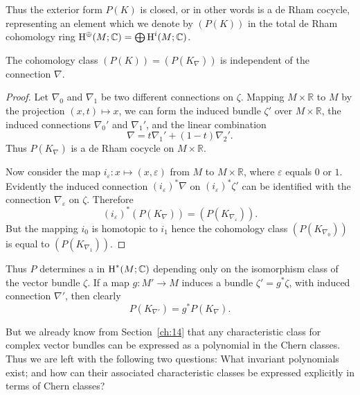 \documentclass[../main]{subfiles}
\begin{document}
Thus the exterior form $P(K)$ is closed, or in other words is a de Rham cocycle, representing an element which we denote by $(P(K))$ in the total de Rham cohomology ring $\operatorname{H}^\oplus(M; \mathbb C) = \bigoplus \operatorname{H}^i(M; \mathbb C)$.

\begin{corollary}
The cohomology class $(P(K)) = (P(K_\nabla))$ is independent of the connection $\nabla$.
\end{corollary}

\begin{proof}
Let $\nabla_0$ and $\nabla_1$ be two different connections on $\zeta$. Mapping $M \times \mathbb R$ to $M$ by the projection $(x, t) \mapsto x$, we can form the induced bundle $\zeta'$ over $M \times \mathbb R$, the induced connections $\nabla_0'$ and $\nabla_1'$, and the linear combination \[\nabla = t \nabla_1' + (1 - t) \nabla_2'.\] Thus $P(K_\nabla)$ is a de Rham cocycle on $M \times \mathbb R$. 

Now consider the map $i_\varepsilon : x \mapsto (x, \varepsilon)$ from $M$ to $M \times \mathbb R$, where $\varepsilon$ equals $0$ or $1$. Evidently the induced connection $(i_\varepsilon)^\ast \nabla$ on $(i_\varepsilon)^\ast \zeta'$ can be identified with the connection $\nabla_\varepsilon$ on $\zeta$. Therefore \[(i_\varepsilon)^\ast (P(K_\nabla)) = (P(K_{\nabla_\varepsilon})).\] But the mapping $i_0$ is homotopic to $i_1$ hence the cohomology class $(P(K_{\nabla_0}))$ is equal to $(P(K_{\nabla_1}))$.
\end{proof}

Thus $P$ determines a  in $\operatorname{H}^\ast(M; \mathbb C)$ depending only on the isomorphism class of the vector bundle $\zeta$. If a map $g : M' \longrightarrow M$ induces a bundle $\zeta' = g^\ast \zeta$, with induced connection $\nabla'$, then clearly \[P(K_{\nabla'}) = g^\ast P(K_\nabla).\]  

But we already know from Section~\ref{ch:14} that any characteristic class for complex vector bundles can be expressed as a polynomial in the Chern classes. Thus we are left with the following two questions: What invariant polynomials exist; and how can their associated characteristic classes be expressed explicitly in terms of Chern classes?
\end{document}
